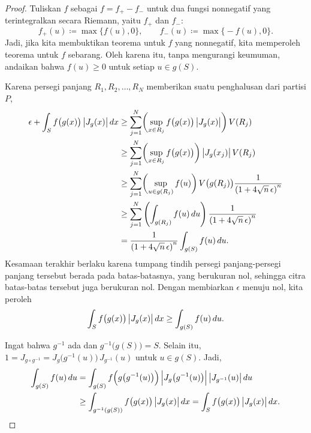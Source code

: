 \begin{proof}
Tuliskan $f$ sebagai
$f = f_+ - f_-$ untuk dua fungsi nonnegatif yang terintegralkan secara Riemann,
yaitu $f_+$ dan $f_-$:
\begin{equation*}
f_+(u) \coloneqq \max \bigl\{ f(u) , 0 \bigr\}, \qquad
f_-(u) \coloneqq \max \bigl\{ -f(u) , 0 \bigr\} .
\end{equation*}
Jadi, jika kita membuktikan teorema untuk $f$ yang nonnegatif,
kita memperoleh teorema untuk $f$ sebarang.
Oleh karena itu, tanpa mengurangi keumuman, andaikan bahwa
$f(u) \geq 0$ untuk setiap $u \in g(S)$.

Karena persegi panjang $R_1,R_2,\ldots,R_N$ memberikan suatu penghalusan dari
partisi $P$,
\begin{equation*}
\begin{split}
\epsilon + \int_S f\bigl(g(x)\bigr) \, \bigl\lvert {J_g(x)} \bigr\rvert \, dx
& \geq
\sum_{j=1}^N \biggl(\sup_{x \in R_j} f\bigl(g(x)\bigr) \, \bigl\lvert {J_g(x)} \bigr\rvert \biggr) \, V(R_j)
\\
& \geq
\sum_{j=1}^N \biggl(\sup_{x \in R_j} f\bigl(g(x)\bigr) \biggr) \, \bigl\lvert {J_g(x_j)} \bigr\rvert \, V(R_j)
\\
& \geq
\sum_{j=1}^N \biggl(\sup_{u \in g(R_j)} f(u) \biggr) \,
V\bigl(g(R_j)\bigr)
\frac{1}{{(1+4\sqrt{n} \, \epsilon)}^n}
\\
& \geq
\sum_{j=1}^N \left(\int_{g(R_j)}f(u) \,du \right)
\frac{1}{{(1+4\sqrt{n} \, \epsilon)}^n}
\\
& =
\frac{1}{{(1+4\sqrt{n} \, \epsilon)}^n}
\int_{g(S)} f(u) \,du .
\end{split}
\end{equation*}
Kesamaan terakhir berlaku karena tumpang tindih persegi panjang-persegi panjang
tersebut berada pada batas-batasnya, yang berukuran nol, sehingga citra
batas-batas tersebut juga berukuran nol.
Dengan membiarkan $\epsilon$ menuju nol, kita peroleh
\begin{equation*}
\int_S f\bigl(g(x)\bigr) \, \bigl\lvert {J_g(x)} \bigr\rvert \, dx \geq \int_{g(S)} f(u) \,du .
\end{equation*}

Ingat bahwa $g^{-1}$ ada dan $g^{-1}\bigl(g(S)\bigr) = S$.
Selain itu, $1 = J_{g\circ g^{-1}} = J_g\bigl(g^{-1}(u)\bigr) \,J_{g^{-1}}(u)$ untuk $u \in g(S)$.
Jadi,
\begin{equation*}
\begin{split}
\int_{g(S)} f(u) \, du
& =
\int_{g(S)} f\Bigl(g\bigl(g^{-1}(u)\bigr)\Bigr) \,
\Bigl\lvert {J_g\bigl(g^{-1}(u)\bigr)} \Bigr\rvert \, \bigl\lvert {J_{g^{-1}}(u)} \bigr\rvert \, du
\\
& \geq
\int_{g^{-1}(g(S))} f\bigl(g(x)\bigr) \, \bigl\lvert {J_g(x)} \bigr\rvert \, dx
=
\int_{S} f\bigl(g(x)\bigr) \, \bigl\lvert {J_g(x)} \bigr\rvert \, dx .
\qedhere
\end{split}
\end{equation*}
\end{proof}



